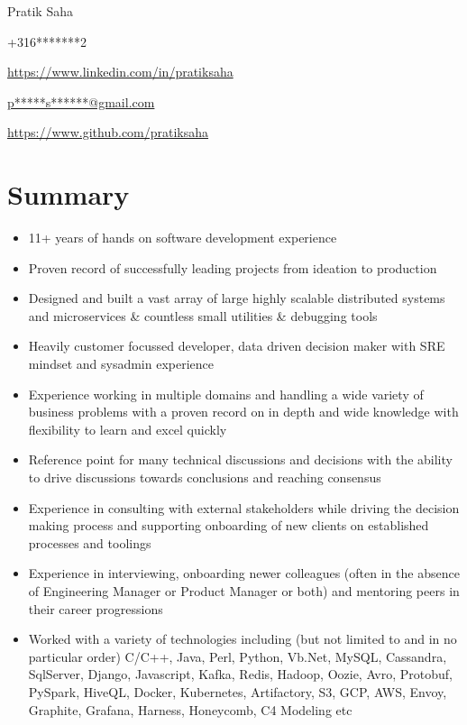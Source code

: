 \documentclass{article}
\begin{document}
\begin{center}\selectfont\Large Pratik Saha\end{center}

{\raggedright \Mobilefone +316*******2} \hfill { \raggedleft \faLinkedin \href{https://www.linkedin.com/in/pratiksaha}{https://www.linkedin.com/in/pratiksaha}   }

{\raggedright {} \href{mailto:p*****s******@gmail.com}{p*****s******@gmail.com}} \hfill { \raggedleft \faGithub \href{https://www.github.com/pratiksaha}{https://www.github.com/pratiksaha} }

\section{Summary}
\begin{itemize}[noitemsep,nolistsep]
\item 11+ years of hands on software development experience
\item Proven record of successfully leading projects from ideation to production
\item Designed and built a vast array of large highly scalable distributed systems and microservices \& countless small utilities \& debugging tools
\item Heavily customer focussed developer, data driven decision maker with SRE mindset and sysadmin experience
\item Experience working in multiple domains and handling a wide variety of business problems with a proven record on in depth and wide knowledge with flexibility to learn and excel quickly
\item Reference point for many technical discussions and decisions with the ability to drive discussions towards conclusions and reaching consensus
\item Experience in consulting with external stakeholders while driving the decision making process and supporting onboarding of new clients on established processes and toolings
\item Experience in interviewing, onboarding newer colleagues (often in the absence of Engineering Manager or Product Manager or both) and mentoring peers in their career progressions
\item Worked with a variety of technologies including (but not limited to and in no particular order) C/C++, Java, Perl, Python, Vb.Net, MySQL, Cassandra, SqlServer, Django, Javascript, Kafka, Redis, Hadoop, Oozie, Avro, Protobuf, PySpark, HiveQL, Docker, Kubernetes, Artifactory, S3, GCP, AWS, Envoy, Graphite, Grafana, Harness, Honeycomb, C4 Modeling etc
\end{itemize}
\end{document}
